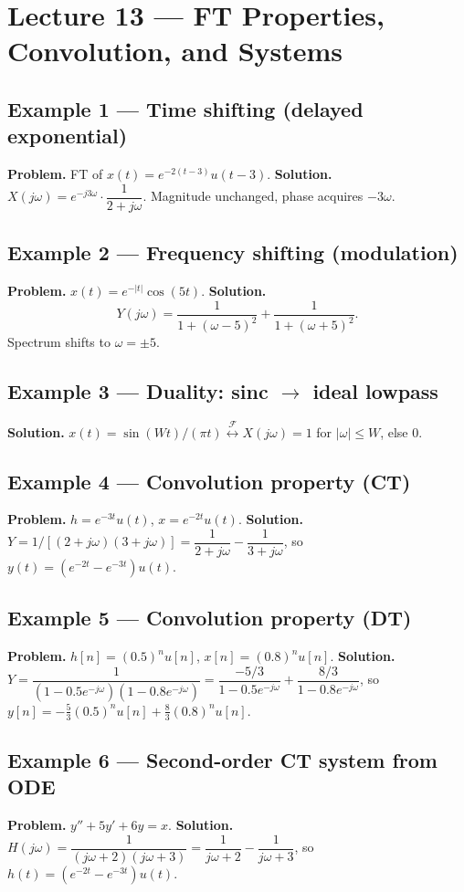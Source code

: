 \documentclass[11pt]{article}
\newcommand{\FT}{\overset{\mathcal{F}}{\longleftrightarrow}}
\begin{document}
\section{Lecture 13 --- FT Properties, Convolution, and Systems}

\subsection{Example 1 --- Time shifting (delayed exponential)}
\textbf{Problem.} FT of $x(t)=e^{-2(t-3)}u(t-3)$.
\textbf{Solution.} $X(j\omega)=e^{-j3\omega}\cdot\dfrac{1}{2+j\omega}$. Magnitude unchanged, phase acquires $-3\omega$.

\subsection{Example 2 --- Frequency shifting (modulation)}
\textbf{Problem.} $x(t)=e^{-|t|}\cos(5t)$.
\textbf{Solution.}
\[Y(j\omega)=\frac{1}{1+(\omega-5)^2}+\frac{1}{1+(\omega+5)^2}.\]
Spectrum shifts to $\omega=\pm 5$.

\subsection{Example 3 --- Duality: sinc $\to$ ideal lowpass}
\textbf{Solution.} $x(t)=\sin(Wt)/(\pi t)\FT X(j\omega)=1$ for $|\omega|\le W$, else $0$.

\subsection{Example 4 --- Convolution property (CT)}
\textbf{Problem.} $h=e^{-3t}u(t)$, $x=e^{-2t}u(t)$.
\textbf{Solution.} $Y=1/[(2+j\omega)(3+j\omega)]=\dfrac{1}{2+j\omega}-\dfrac{1}{3+j\omega}$, so $y(t)=(e^{-2t}-e^{-3t})u(t)$.

\subsection{Example 5 --- Convolution property (DT)}
\textbf{Problem.} $h[n]=(0.5)^n u[n]$, $x[n]=(0.8)^n u[n]$.
\textbf{Solution.} $Y=\dfrac{1}{(1-0.5e^{-j\omega})(1-0.8e^{-j\omega})}=\dfrac{-5/3}{1-0.5e^{-j\omega}}+\dfrac{8/3}{1-0.8e^{-j\omega}}$, so $y[n]=-\tfrac53(0.5)^n u[n]+\tfrac83(0.8)^n u[n]$.

\subsection{Example 6 --- Second-order CT system from ODE}
\textbf{Problem.} $y''+5y'+6y=x$.
\textbf{Solution.} $H(j\omega)=\dfrac{1}{(j\omega+2)(j\omega+3)}=\dfrac{1}{j\omega+2}-\dfrac{1}{j\omega+3}$, so $h(t)=(e^{-2t}-e^{-3t})u(t)$.
\end{document}
